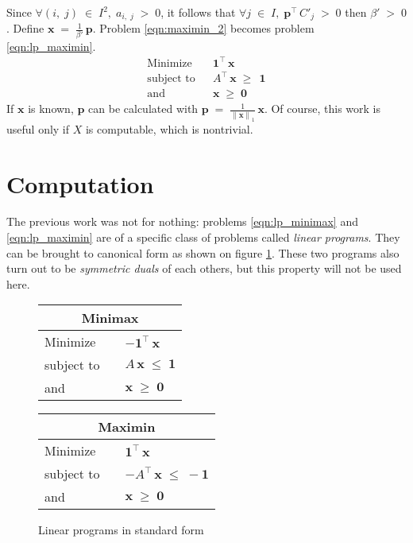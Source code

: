 \documentclass{report}
\theoremstyle{definition}
\theoremstyle{plain}
\begin{document}
Since $\forall\left(i,\;j\right)\;\in\;I^2,\;a_{i,\;j}\;>\;0$, it follows that
$\forall j\;\in\;I,\;\mathbf p^\top\,C'_j\;>\;0$ then $\beta'\;>\;0$. Define
$\mathbf x\;=\;\frac1{\beta'}\,\mathbf p$. Problem \ref{eqn:maximin_2} becomes
problem \ref{eqn:lp_maximin}.
\begin{equation}
	\begin{array}{lll}
		\text{Minimize} & & \mathbf 1^\top\,\mathbf x \\
		\text{subject to} & &
			A^\top\,\mathbf x\;\geqslant\;\,\mathbf 1 \\
		\text{and} & & \mathbf x\;\geqslant\;\mathbf 0
	\end{array}
	\label{eqn:lp_maximin}
\end{equation}
If $\mathbf x$ is known, $\mathbf p$ can be calculated with
$\mathbf p\;=\;\frac1{\left\|\mathbf x\right\|_1}\,\mathbf x$. Of course, this
work is useful only if $X$ is computable, which is nontrivial.

\section{Computation}
The previous work was not for nothing: problems
\ref{eqn:lp_minimax} and \ref{eqn:lp_maximin} are of
a specific class of problems called \emph{linear programs}. They can be brought
to canonical form as shown on figure \ref{fig:lp_standard}. These two programs
also turn out to be \emph{symmetric duals} of each others, but this property
will not be used here.
\begin{figure}[ht!]
	\centering
	\begin{tabular}{|lll|}
		\hline
		\multicolumn{3}{|c|}{Minimax} \\
		\hline
		Minimize & & $-\mathbf 1^\top\,\mathbf x$ \\
		subject to & & $A\,\mathbf x\;\leqslant\;\mathbf 1$ \\
		and & & $\mathbf x\;\geqslant\;\mathbf 0$ \\
		\hline
	\end{tabular}
	\begin{tabular}{|lll|}
		\hline
		\multicolumn{3}{|c|}{Maximin} \\
		\hline
		Minimize & & $\mathbf 1^\top\,\mathbf x$ \\
		subject to & & $-A^\top\,\mathbf x\;\leqslant\;-\mathbf 1$ \\
		and & & $\mathbf x\;\geqslant\;\mathbf 0$ \\
		\hline
	\end{tabular}
	\caption{Linear programs in standard form}
	\label{fig:lp_standard}
\end{figure}
\end{document}
